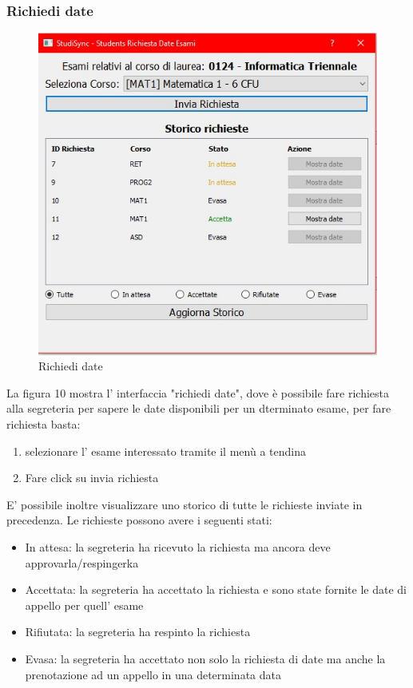 \documentclass{article}
\begin{document}
\subsubsection{Richiedi date}
\begin{figure}
    \centering
    \includegraphics[width=1\linewidth]{IMG/richiediDate.jpg}
    \caption{Richiedi date}
    \label{fig:enter-label}
\end{figure}
La figura 10 mostra l' interfaccia "richiedi date", dove è possibile fare richiesta alla segreteria per sapere le date disponibili per un dterminato esame, per fare richiesta basta:
\begin{enumerate}
    \item selezionare l' esame interessato tramite il menù a tendina 
    \item Fare click su invia richiesta
\end{enumerate}

E' possibile inoltre visualizzare uno storico di tutte le richieste inviate in precedenza. 
Le richieste possono avere i seguenti stati:
\begin{itemize}
    \item In attesa: la segreteria ha ricevuto la richiesta ma ancora deve approvarla/respingerka
    \item Accettata: la segreteria ha accettato la richiesta e sono state fornite le date di appello per quell' esame
    \item Rifiutata: la segreteria ha respinto la richiesta
    \item Evasa: la segreteria ha accettato non solo la richiesta di date ma anche la prenotazione ad un appello in una determinata data

\end{itemize}
\end{document}
